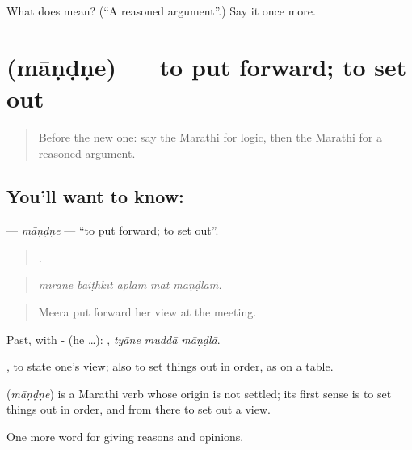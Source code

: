 \begin{tcolorbox}[breakable,colback=teal!4,colframe=teal!35!black,title={Before you move on}]
What does  mean? (\textquotedblleft{}A reasoned argument\textquotedblright{}.) Say it once more.
\end{tcolorbox}
\section[\texorpdfstring{\mr{मांडणे} (māṇḍṇe)}{मांडणे (māṇḍṇe)}]{ (māṇḍṇe) — to put forward; to set out}

\label{lesson:MR-C343-mandne}



\begin{quote}
Before the new one: say the Marathi for logic, then the Marathi for a reasoned argument.
\end{quote}

\subsection*{You'll want to know: }
\textbf{} — \emph{māṇḍṇe} — \textquotedblleft{}to put forward; to set out\textquotedblright{}.

\begin{quote}
    .
\end{quote}

\begin{quote}
\emph{mīrāne baiṭhkīt āplaṁ mat māṇḍlaṁ.}
\end{quote}

\begin{quote}
Meera put forward her view at the meeting.
\end{quote}

Past, with - (he …):   , \emph{tyāne muddā māṇḍlā}.

 , to state one's view; also to set things out in order, as on a table.

\begin{cousinweb}
\textbf{} (\emph{māṇḍṇe}) is a Marathi verb whose origin is not settled; its first sense is to set things out in order, and from there to set out a view.
\end{cousinweb}

\begin{grammarlens}[title={What you've built}]
One more word for giving reasons and opinions.
\end{grammarlens}

